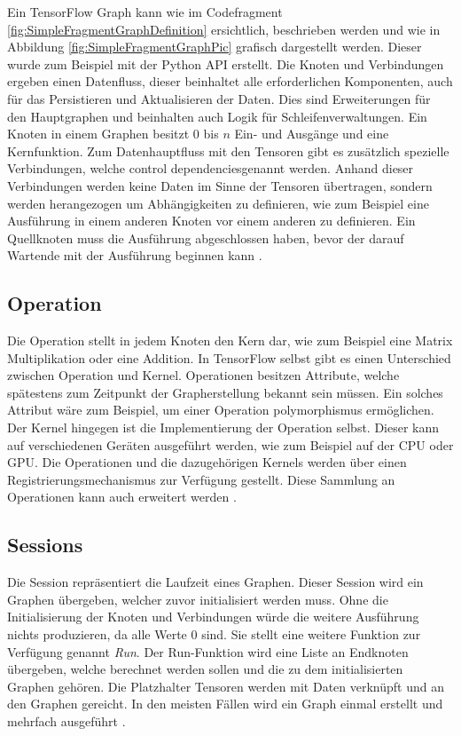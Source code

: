 Ein TensorFlow Graph kann wie im Codefragment \ref{fig:SimpleFragmentGraphDefinition} ersichtlich, beschrieben werden und wie in Abbildung \ref{fig:SimpleFragmentGraphPic} grafisch dargestellt werden.
Dieser wurde zum Beispiel mit der Python API erstellt.
Die Knoten und Verbindungen ergeben einen Datenfluss, dieser beinhaltet alle erforderlichen Komponenten, auch für das Persistieren und Aktualisieren der Daten.
Dies sind Erweiterungen für den Hauptgraphen und beinhalten auch Logik für Schleifenverwaltungen.
Ein Knoten in einem Graphen besitzt $0$ bis $n$ Ein- und Ausgänge und eine Kernfunktion. 
Zum Datenhauptfluss mit den Tensoren gibt es zusätzlich spezielle Verbindungen, welche \glqq control dependencies\grqq genannt werden. 
Anhand dieser Verbindungen werden keine Daten im Sinne der Tensoren übertragen, sondern werden herangezogen um Abhängigkeiten zu definieren, wie zum Beispiel eine Ausführung in einem anderen Knoten vor einem anderen zu definieren.
Ein Quellknoten muss die Ausführung abgeschlossen haben, bevor der darauf Wartende mit der Ausführung beginnen kann \cite{wp2015tensorflow}. \\ 

\subsection{Operation}

Die Operation stellt in jedem Knoten den Kern dar, wie zum Beispiel eine Matrix Multiplikation oder eine Addition.
In TensorFlow selbst gibt es einen Unterschied zwischen Operation und Kernel.
Operationen besitzen Attribute, welche spätestens zum Zeitpunkt der Grapherstellung bekannt sein müssen. 
Ein solches Attribut wäre zum Beispiel, um einer Operation polymorphismus ermöglichen.  
Der Kernel hingegen ist die Implementierung der Operation selbst. 
Dieser kann auf verschiedenen Geräten ausgeführt werden, wie zum Beispiel auf der CPU oder GPU.
Die Operationen und die dazugehörigen Kernels werden über einen Registrierungsmechanismus zur Verfügung gestellt. 
Diese Sammlung an Operationen kann auch erweitert werden \cite{wp2015tensorflow}. 

\subsection{Sessions}

Die Session repräsentiert die Laufzeit eines Graphen. 
Dieser Session wird ein Graphen übergeben, welcher zuvor initialisiert werden muss. 
Ohne die Initialisierung der Knoten und Verbindungen würde die weitere Ausführung nichts produzieren, da alle Werte $0$ sind. 
Sie stellt eine weitere Funktion zur Verfügung genannt \textit{Run}. 
Der Run-Funktion wird eine Liste an Endknoten übergeben, welche berechnet werden sollen und die zu dem initialisierten Graphen gehören. 
Die Platzhalter Tensoren werden mit Daten verknüpft und an den Graphen gereicht. 
In den meisten Fällen wird ein Graph einmal erstellt und mehrfach ausgeführt \cite{wp2015tensorflow}. 


